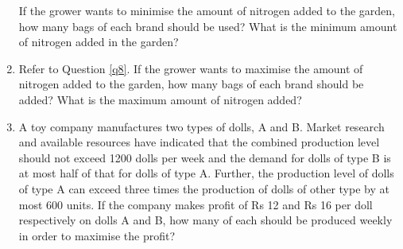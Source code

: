 \documentclass[journal,12pt,twocolumn]{IEEEtran}
\begin{document}
\begin{enumerate}
If the grower wants to minimise the amount of nitrogen added to the garden, how many bags of each brand should be used? What is the minimum amount of nitrogen added in the garden?

\begin{table}[h]
\centering

\caption{}
\end{table}

\item Refer to Question \ref{q8}. If the grower wants to maximise the amount of nitrogen added to the garden, how many bags of each brand should be added? What is the maximum amount of nitrogen added?

\item A toy company manufactures two types of dolls, A and B. Market research and available resources have indicated that the combined production level should not exceed 1200 dolls per week and the demand for dolls of type B is at most half of that for dolls of type A. Further, the production level of dolls of type A can exceed three times the production of dolls of other type by at most 600 units. If the company makes profit of Rs 12 and Rs 16 per doll respectively on dolls A and B, how many of each should be produced weekly in order to maximise the profit?

\end{enumerate}
\end{document}
